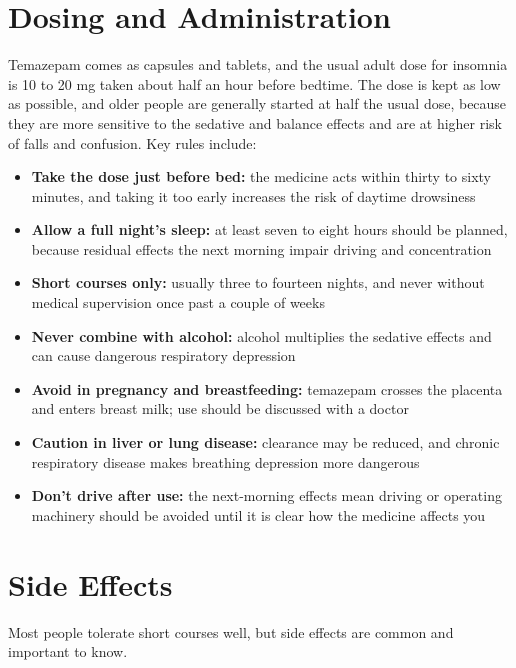 \section*{Dosing and Administration}
Temazepam comes as capsules and tablets, and the usual adult dose for insomnia is 10 to 20 mg taken about half an hour before bedtime. The dose is kept as low as possible, and older people are generally started at half the usual dose, because they are more sensitive to the sedative and balance effects and are at higher risk of falls and confusion. Key rules include:

\begin{itemize}
    \item \textbf{Take the dose just before bed:} the medicine acts within thirty to sixty minutes, and taking it too early increases the risk of daytime drowsiness
    \item \textbf{Allow a full night's sleep:} at least seven to eight hours should be planned, because residual effects the next morning impair driving and concentration
    \item \textbf{Short courses only:} usually three to fourteen nights, and never without medical supervision once past a couple of weeks
    \item \textbf{Never combine with alcohol:} alcohol multiplies the sedative effects and can cause dangerous respiratory depression
    \item \textbf{Avoid in pregnancy and breastfeeding:} temazepam crosses the placenta and enters breast milk; use should be discussed with a doctor
    \item \textbf{Caution in liver or lung disease:} clearance may be reduced, and chronic respiratory disease makes breathing depression more dangerous
    \item \textbf{Don't drive after use:} the next-morning effects mean driving or operating machinery should be avoided until it is clear how the medicine affects you
\end{itemize}

\section*{Side Effects}
Most people tolerate short courses well, but side effects are common and important to know.

